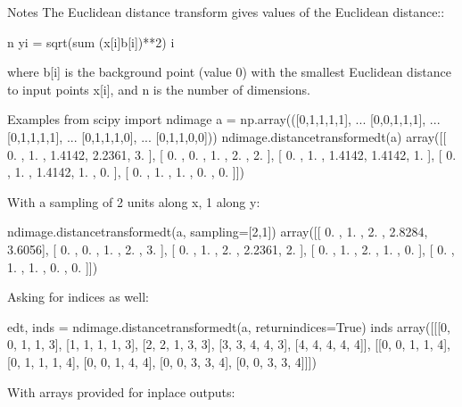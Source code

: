 \documentclass[letterpaper,10pt,english]{sphinxmanual}
\begin{document}
\begin{sphinxVerbatim}[commandchars=\\\{\}]
    Notes
    \PYGZhy{}\PYGZhy{}\PYGZhy{}\PYGZhy{}\PYGZhy{}
    The Euclidean distance transform gives values of the Euclidean
    distance::
    
                    n
      y\PYGZus{}i = sqrt(sum (x[i]\PYGZhy{}b[i])**2)
                    i
    
    where b[i] is the background point (value 0) with the smallest
    Euclidean distance to input points x[i], and n is the
    number of dimensions.
    
    Examples
    \PYGZhy{}\PYGZhy{}\PYGZhy{}\PYGZhy{}\PYGZhy{}\PYGZhy{}\PYGZhy{}\PYGZhy{}
    \PYGZgt{}\PYGZgt{}\PYGZgt{} from scipy import ndimage
    \PYGZgt{}\PYGZgt{}\PYGZgt{} a = np.array(([0,1,1,1,1],
    ...               [0,0,1,1,1],
    ...               [0,1,1,1,1],
    ...               [0,1,1,1,0],
    ...               [0,1,1,0,0]))
    \PYGZgt{}\PYGZgt{}\PYGZgt{} ndimage.distance\PYGZus{}transform\PYGZus{}edt(a)
    array([[ 0.    ,  1.    ,  1.4142,  2.2361,  3.    ],
           [ 0.    ,  0.    ,  1.    ,  2.    ,  2.    ],
           [ 0.    ,  1.    ,  1.4142,  1.4142,  1.    ],
           [ 0.    ,  1.    ,  1.4142,  1.    ,  0.    ],
           [ 0.    ,  1.    ,  1.    ,  0.    ,  0.    ]])
    
    With a sampling of 2 units along x, 1 along y:
    
    \PYGZgt{}\PYGZgt{}\PYGZgt{} ndimage.distance\PYGZus{}transform\PYGZus{}edt(a, sampling=[2,1])
    array([[ 0.    ,  1.    ,  2.    ,  2.8284,  3.6056],
           [ 0.    ,  0.    ,  1.    ,  2.    ,  3.    ],
           [ 0.    ,  1.    ,  2.    ,  2.2361,  2.    ],
           [ 0.    ,  1.    ,  2.    ,  1.    ,  0.    ],
           [ 0.    ,  1.    ,  1.    ,  0.    ,  0.    ]])
    
    Asking for indices as well:
    
    \PYGZgt{}\PYGZgt{}\PYGZgt{} edt, inds = ndimage.distance\PYGZus{}transform\PYGZus{}edt(a, return\PYGZus{}indices=True)
    \PYGZgt{}\PYGZgt{}\PYGZgt{} inds
    array([[[0, 0, 1, 1, 3],
            [1, 1, 1, 1, 3],
            [2, 2, 1, 3, 3],
            [3, 3, 4, 4, 3],
            [4, 4, 4, 4, 4]],
           [[0, 0, 1, 1, 4],
            [0, 1, 1, 1, 4],
            [0, 0, 1, 4, 4],
            [0, 0, 3, 3, 4],
            [0, 0, 3, 3, 4]]])
    
    With arrays provided for inplace outputs:
    

\end{sphinxVerbatim}
\end{document}
